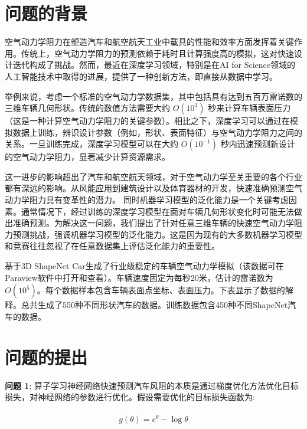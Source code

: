 \documentclass{MMCStyle}
\begin{document}
	\tableofcontents\newpage
    \clearpage
    \pagestyle{fancy}






 
\section{问题的背景}

空气动力学阻力在塑造汽车和航空航天工业中载具的性能和效率方面发挥着关键作用。传统上，空气动力学阻力的预测依赖于耗时且计算强度高的模拟，这对快速设计迭代构成了挑战。然而，最近在深度学习领域，特别是在AI for Science领域的人工智能技术中取得的进展，提供了一种创新方法，即直接从数据中学习。

举例来说，考虑一个标准的空气动力学数据集，其中包括具有达到五百万雷诺数的三维车辆几何形状。传统的数值方法需要大约 $O(10^3)$ 秒来计算车辆表面压力（这是一种计算空气动力学阻力的关键参数）。相比之下，深度学习可以通过在模拟数据上训练，辨识设计参数（例如，形状、表面特征）与空气动力学阻力之间的关系。一旦训练完成，深度学习模型可以在大约 $O(10^{-1})$ 秒内迅速预测新设计的空气动力学阻力，显著减少计算资源需求。

这一进步的影响超出了汽车和航空航天领域，对于空气动力学至关重要的各个行业都有深远的影响。从风能应用到建筑设计以及体育器材的开发，快速准确预测空气动力学阻力具有变革性的潜力。
同时机器学习模型的泛化能力是一个关键考虑因素。通常情况下，经过训练的深度学习模型在面对车辆几何形状变化时可能无法做出准确预测。为解决这一问题，我们提出了针对任意三维车辆的快速空气动力学阻力预测挑战，强调机器学习模型的泛化能力。这是因为现有的大多数机器学习模型和竞赛往往忽视了在任意数据集上评估泛化能力的重要性。

基于3D ShapeNet Car生成了行业级稳定的车辆空气动力学模拟（该数据可在Paraview软件中打开和查看）。车辆速度固定为每秒20米，估计的雷诺数为$O(10^5)$。每个数据样本包含车辆表面点坐标、表面压力。下表显示了数据的解释。总共生成了550种不同形状汽车的数据。训练数据包含450种不同ShapeNet汽车的数据。

	\section{问题的提出}
\textbf{问题 1}: 算子学习神经网络快速预测汽车风阻的本质是通过梯度优化方法优化目标损失，对神经网络的参数进行优化。假设需要优化的目标损失函数为: 

\begin{eqnarray} \label{formula 2}
\begin{aligned} g(\theta)=e^\theta-\log\theta
\end{aligned}
\end{eqnarray}
\end{document}
